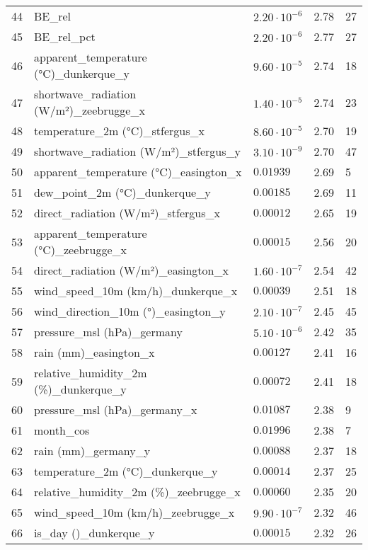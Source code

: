 \begin{table}[H]
\begin{tabular}{r l l l l}
        44 & BE\_rel & $2.20 \cdot 10^{-6}$ & 2.78 & 27 \\
        45 & BE\_rel\_pct & $2.20 \cdot 10^{-6}$ & 2.77 & 27 \\
        46 & apparent\_temperature (°C)\_dunkerque\_y & $9.60 \cdot 10^{-5}$ & 2.74 & 18 \\
        47 & shortwave\_radiation (W/m²)\_zeebrugge\_x & $1.40 \cdot 10^{-5}$ & 2.74 & 23 \\
        48 & temperature\_2m (°C)\_stfergus\_x & $8.60 \cdot 10^{-5}$ & 2.70 & 19 \\
        49 & shortwave\_radiation (W/m²)\_stfergus\_y & $3.10 \cdot 10^{-9}$ & 2.70 & 47 \\
        50 & apparent\_temperature (°C)\_easington\_x & $0.01939$ & 2.69 & 5 \\
        51 & dew\_point\_2m (°C)\_dunkerque\_y & $0.00185$ & 2.69 & 11 \\
        52 & direct\_radiation (W/m²)\_stfergus\_x & $0.00012$ & 2.65 & 19 \\
        53 & apparent\_temperature (°C)\_zeebrugge\_x & $0.00015$ & 2.56 & 20 \\
        54 & direct\_radiation (W/m²)\_easington\_x & $1.60 \cdot 10^{-7}$ & 2.54 & 42 \\
        55 & wind\_speed\_10m (km/h)\_dunkerque\_x & $0.00039$ & 2.51 & 18 \\
        56 & wind\_direction\_10m (°)\_easington\_y & $2.10 \cdot 10^{-7}$ & 2.45 & 45 \\
        57 & pressure\_msl (hPa)\_germany & $5.10 \cdot 10^{-6}$ & 2.42 & 35 \\
        58 & rain (mm)\_easington\_x & $0.00127$ & 2.41 & 16 \\
        59 & relative\_humidity\_2m (\%)\_dunkerque\_y & $0.00072$ & 2.41 & 18 \\
        60 & pressure\_msl (hPa)\_germany\_x & $0.01087$ & 2.38 & 9 \\
        61 & month\_cos & $0.01996$ & 2.38 & 7 \\
        62 & rain (mm)\_germany\_y & $0.00088$ & 2.37 & 18 \\
        63 & temperature\_2m (°C)\_dunkerque\_y & $0.00014$ & 2.37 & 25 \\
        64 & relative\_humidity\_2m (\%)\_zeebrugge\_x & $0.00060$ & 2.35 & 20 \\
        65 & wind\_speed\_10m (km/h)\_zeebrugge\_x & $9.90 \cdot 10^{-7}$ & 2.32 & 46 \\
        66 & is\_day ()\_dunkerque\_y & $0.00015$ & 2.32 & 26 \\

\end{tabular}
\end{table}
